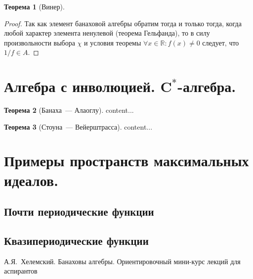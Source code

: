 \documentclass[12pt]{extarticle}
\theoremstyle{definition}
\newtheorem{theorem}{\indent Теорема}[section]
\begin{document}
\begin{theorem}[Винер]
\begin{proof}
		Так как элемент банаховой алгебры обратим тогда и только тогда, когда любой характер элемента ненулевой (теорема Гельфанда), то в силу произвольности выбора $\chi$ и условия теоремы $\forall x\in\mathbb{R}: f(x)\neq 0$ следует, что $1/f\in A$.
    \end{proof}
        \end{theorem}

    \section{Алгебра с инволюцией. \(\symbf{C^*}\)-алгебра.}
        \begin{theorem}[Банаха~--- Алаоглу]\label{th:Alaoglu}
            content...
        \end{theorem}
        \begin{theorem}[Стоуна~--- Вейерштрасса]\label{th:StoneWrstrs}
            content...
        \end{theorem}

    \section[Примеры пространств максимальных идеалов]{Примеры пространств максимальных идеалов.}
        \subsection{Почти периодические функции}
        \subsection{Квазипериодические функции}
    \newpage
    \begin{thebibliography}{10}
        А.Я.~Хелемский. Банаховы алгебры. Ориентировочный мини-курс лекций для аспирантов
    \end{thebibliography}
\end{document}
